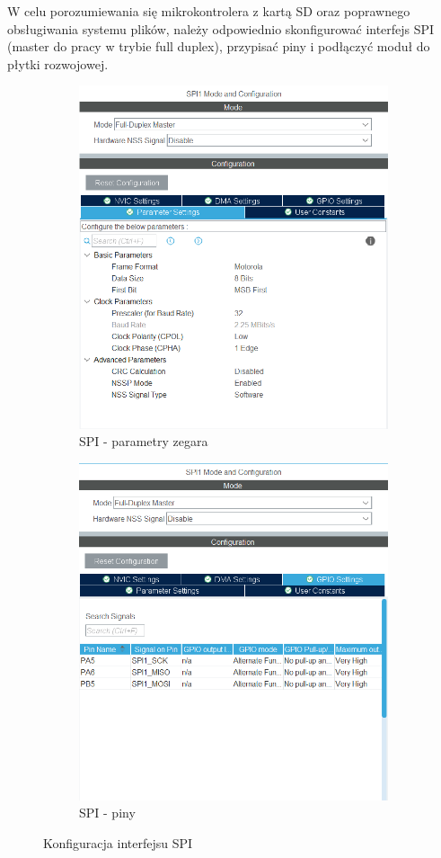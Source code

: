 \documentclass[11pt, a4paper]{article}
\begin{document}
W celu porozumiewania się mikrokontrolera z kartą SD oraz poprawnego obsługiwania systemu plików, należy odpowiednio skonfigurować interfejs SPI (master do pracy w trybie full duplex), przypisać piny i podłączyć moduł do płytki rozwojowej. 
\begin{figure}[h!]
\centering
\begin{subfigure}{.5\textwidth}
  \centering
  \includegraphics[width=.74\linewidth]{fig/KY-018/działanie_ukladu/spi.png}
  \caption{SPI - parametry zegara}
  \label{fig:sub1}
\end{subfigure}%
\begin{subfigure}{.5\textwidth}
  \centering
  \includegraphics[width=0.74\linewidth]{fig/KY-018/działanie_ukladu/spi2.png}
  \caption{SPI - piny}
  \label{fig:sub2}
\end{subfigure}
\caption{Konfiguracja interfejsu SPI}
\label{fig:test}
\end{figure}
\end{document}
